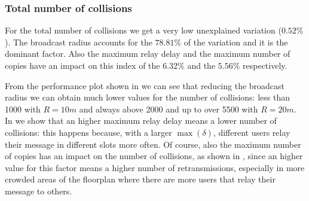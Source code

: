 \subsubsection{Total number of collisions}\label{subsubsec:hd2krcollisions}

For the total number of collisions we get a very low unexplained variation
(\(0.52\%\)). The broadcast radius accounts for the \(78.81\%\) of the variation
and it is the dominant factor. Also the maximum relay delay and the maximum
number of copies have an impact on this index of the \(6.32\%\) and the
\(5.56\%\) respectively.

From the performance plot shown in  we can see
that reducing the broadcast radius we can obtain much lower values for the
number of collisions: less than 1000 with \(R\!=\!10m\) and always above 2000
and up to over 5500 with \(R\!=\!20m\). In  we
show that an higher maximum relay delay means a lower number of collisions: this
happens because, with a larger \(\max(\delta)\), different users relay their
message in different slots more often. Of course, also the maximum number of
copies has an impact on the number of collisions, as shown in
, since an higher value for this factor means a
higher number of retransmissions, especially in more crowded areas of the
floorplan where there are more users that relay their message to others.

